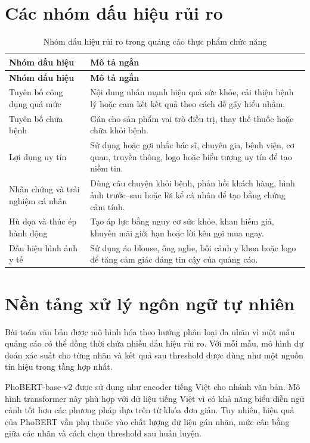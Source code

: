 \section{Các nhóm dấu hiệu rủi ro}
\begin{longtable}{|L{0.27\textwidth}|L{0.63\textwidth}|}
\caption{Nhóm dấu hiệu rủi ro trong quảng cáo thực phẩm chức năng}\\
\hline
\textbf{Nhóm dấu hiệu} & \textbf{Mô tả ngắn} \\
\hline
\endfirsthead
\hline
\textbf{Nhóm dấu hiệu} & \textbf{Mô tả ngắn} \\
\hline
\endhead
Tuyên bố công dụng quá mức & Nội dung nhấn mạnh hiệu quả sức khỏe, cải thiện bệnh lý hoặc cam kết kết quả theo cách dễ gây hiểu nhầm. \\ \hline
Tuyên bố chữa bệnh & Gán cho sản phẩm vai trò điều trị, thay thế thuốc hoặc chữa khỏi bệnh. \\ \hline
Lợi dụng uy tín & Sử dụng hoặc gợi nhắc bác sĩ, chuyên gia, bệnh viện, cơ quan, truyền thông, logo hoặc biểu tượng uy tín để tạo niềm tin. \\ \hline
Nhân chứng và trải nghiệm cá nhân & Dùng câu chuyện khỏi bệnh, phản hồi khách hàng, hình ảnh trước--sau hoặc lời kể cá nhân để tạo bằng chứng cảm tính. \\ \hline
Hù dọa và thúc ép hành động & Tạo áp lực bằng nguy cơ sức khỏe, khan hiếm giả, khuyến mãi giới hạn hoặc lời kêu gọi mua ngay. \\ \hline
Dấu hiệu hình ảnh y tế & Sử dụng áo blouse, ống nghe, bối cảnh y khoa hoặc logo để tăng cảm giác đáng tin cậy của quảng cáo. \\ \hline
\end{longtable}

\section{Nền tảng xử lý ngôn ngữ tự nhiên}
Bài toán văn bản được mô hình hóa theo hướng phân loại đa nhãn vì một mẫu quảng cáo có thể đồng thời chứa nhiều dấu hiệu rủi ro. Với mỗi mẫu, mô hình dự đoán xác suất cho từng nhãn và kết quả sau threshold được dùng như một nguồn tín hiệu trong tầng hợp nhất.

PhoBERT-base-v2 được sử dụng như encoder tiếng Việt cho nhánh văn bản. Mô hình transformer này phù hợp với dữ liệu tiếng Việt vì có khả năng biểu diễn ngữ cảnh tốt hơn các phương pháp dựa trên từ khóa đơn giản. Tuy nhiên, hiệu quả của PhoBERT vẫn phụ thuộc vào chất lượng dữ liệu gán nhãn, mức cân bằng giữa các nhãn và cách chọn threshold sau huấn luyện.

